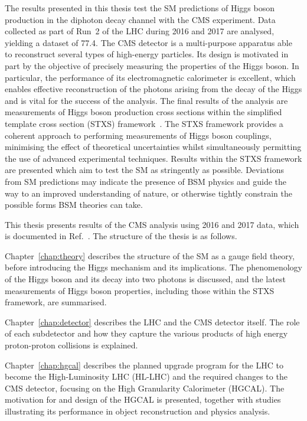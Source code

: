 The results presented in this thesis test the SM predictions of Higgs boson production
in the diphoton decay channel with the CMS experiment.
Data collected as part of Run~2 of the LHC during 2016 and 2017 are analysed, 
yielding a dataset of \SI{77.4}{\fbinv}.
The CMS detector is a multi-purpose apparatus able to reconstruct several types of high-energy particles.
Its design is motivated in part by the objective of precisely measuring the properties of the Higgs boson.
In particular, the performance of its electromagnetic calorimeter is excellent, 
which enables effective reconstruction of the photons arising from the decay of the Higgs 
and is vital for the success of the \Hgg analysis.
The final results of the analysis are measurements of Higgs boson production cross sections
within the simplified template cross section (STXS) framework~\cite{YR4}.
The STXS framework provides a coherent approach to performing measurements of Higgs boson couplings, 
minimising the effect of theoretical uncertainties 
whilst simultaneously permitting the use of advanced experimental techniques.
Results within the STXS framework are presented
which aim to test the SM as stringently as possible.
Deviations from SM predictions may indicate the presence of BSM physics 
and guide the way to an improved understanding of nature, 
or otherwise tightly constrain the possible forms BSM theories can take.

This thesis presents results of the CMS \Hgg analysis using 2016 and 2017 data, 
which is documented in Ref.~\cite{HIG-18-029}.
The structure of the thesis is as follows.

Chapter~\ref{chap:theory} describes the structure of the SM as a gauge field theory, 
before introducing the Higgs mechanism and its implications.
The phenomenology of the Higgs boson and its decay into two photons is discussed, 
and the latest measurements of Higgs boson properties, including those within the STXS framework, 
are summarised.

Chapter~\ref{chap:detector} describes the LHC and the CMS detector itself.
The role of each subdetector and how they capture the various products 
of high energy proton-proton collisions is explained.

Chapter~\ref{chap:hgcal} describes the planned upgrade program for the LHC to become the High-Luminosity LHC (HL-LHC) 
and the required changes to the CMS detector, focusing on the High Granularity Calorimeter (HGCAL).
The motivation for and design of the HGCAL is presented, 
together with studies illustrating its performance in object reconstruction and physics analysis.

